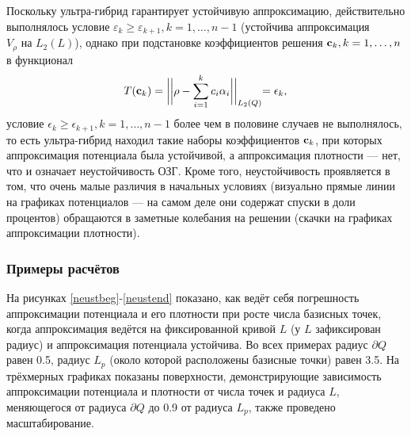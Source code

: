 \documentclass[a4paper, 12pt]{article}
\begin{document}
Поскольку ультра-гибрид гарантирует устойчивую аппроксимацию, действительно выполнялось условие $\varepsilon_k \geq \varepsilon_{k+1}, k=1, \dots, n-1$ (устойчива аппроксимация $V_{\rho} \text{ на } L_2(L)$), однако при подстановке коэффициентов решения ${\bf c}_k, k=1,\dots,n$ в функционал
\begin{equation*}
  T({\bf c}_k)=\biggl|\biggl|\rho - \sum_{i=1}^k c_i \alpha_i\biggl|\biggl|_{L_2(Q)}=\epsilon_k,
\end{equation*}
условие $\epsilon_k \geq \epsilon_{k+1}, k=1, \dots, n-1$ более чем в половине случаев не выполнялось, то есть ультра-гибрид находил такие наборы коэффициентов ${\bf c}_k$, при которых
аппроксимация потенциала была устойчивой, а аппроксимация плотности --- нет, что и означает неустойчивость ОЗГ.
Кроме того, неустойчивость проявляется в том, что очень малые различия в начальных условиях (визуально прямые линии на графиках потенциалов --- на самом деле они содержат спуски в доли процентов) обращаются в заметные колебания на решении (скачки на графиках аппроксимации плотности). 

\subsubsection{Примеры расчётов}
На рисунках \ref{neustbeg}-\ref{neustend} показано, как ведёт себя погрешность аппроксимации потенциала и его плотности при росте числа базисных точек, когда аппроксимация ведётся на фиксированной кривой $L$ (у $L$ зафиксирован радиус) и аппроксимация потенциала устойчива.
Во всех примерах радиус $\partial Q$ равен 0.5, радиус $L_p$ (около которой расположены базисные точки) равен 3.5. На трёхмерных графиках показаны поверхности, демонстрирующие зависимость аппроксимации потенциала и плотности от числа точек и радиуса $L$, меняющегося от радиуса $\partial Q$ до 0.9 от радиуса $L_p$, также проведено масштабирование.
\end{document}
